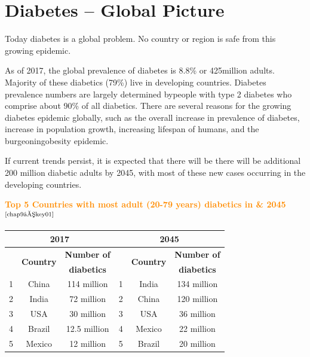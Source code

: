 \chapter{Diabetes – Global Picture}\label{chap9}

Today diabetes is a global problem. No country or region is safe from this growing epidemic.

As of 2017, the global prevalence of diabetes is 8.8\% or 425\break million adults. Majority of these diabetics (79\%) live in developing countries. Diabetes prevalence numbers are largely determined by\break people with type 2 diabetes who comprise about 90\% of all diabetics. There are several reasons for the growing diabetes epidemic globally, such as the overall increase in prevalence of diabetes, increase in population growth, increasing lifespan of humans, and the burgeoning\break obesity epidemic.

If current trends persist, it is expected that there will be there will be additional 200 million diabetic adults by 2045, with most of these new cases occurring in the developing countries.

\vskip 9pt

\textcolor{darkorange}{\textbf{Top 5 Countries with most adult (20-79 years) diabetics in \& 2045}$^{\text{\cite{chap9–key01}}}$}

{
\begin{table}
\centering
\begin{tabular}{|c|c|c|c|c|c|}
\hline
\multicolumn{3}{|c|}{{\cellcolor{lightblue}\large\textbf{2017}}} & \multicolumn{3}{c|}{{\cellcolor{yellow}\large\textbf{2045}}}\\
\hline
 & \multirow{2}{1.4cm}{\textbf{Country}} & \textbf{Number of} &  & \multirow{2}{1.4cm}{\textbf{Country}} & \textbf{Number of}\\
 &  & \textbf{diabetics} &  &  & \textbf{diabetics}\\
 \hline
1 & China & 114 million & 1 & India & 134 million\\
 \hline
2 & India & 72 million & 2 & China & 120 million\\
 \hline
3 & USA & 30 million & 3 & USA & 36 million\\
 \hline
4 & Brazil & 12.5 million & 4 & Mexico & 22 million\\
 \hline
5 & Mexico & 12 million & 5 & Brazil & 20 million\\
 \hline
\end{tabular}
\end{table}
}\relax

